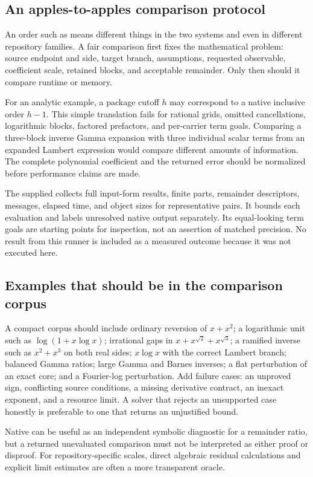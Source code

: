\documentclass[11pt,letterpaper]{article}
\newcommand{\code}[1]{\texttt{\small\detokenize{#1}}}
\begin{document}
\subsection{An apples-to-apples comparison protocol}
An order such as \code{4} means different things in the two systems and even in different repository families. A fair comparison first fixes the mathematical problem: source endpoint and side, target branch, assumptions, requested observable, coefficient scale, retained blocks, and acceptable remainder. Only then should it compare runtime or memory.

For an analytic example, a package cutoff $h$ may correspond to a native inclusive order $h-1$. This simple translation fails for rational grids, omitted cancellations, logarithmic blocks, factored prefactors, and per-carrier term goals. Comparing a three-block inverse Gamma expansion with three individual scalar terms from an expanded Lambert expression would compare different amounts of information. The complete polynomial coefficient and the returned error should be normalized before performance claims are made.

The supplied \code{CompareBuiltins.wl} collects full input-form results, finite parts, remainder descriptors, messages, elapsed time, and object sizes for representative pairs. It bounds each evaluation and labels unresolved native output separately. Its equal-looking term goals are starting points for inspection, not an assertion of matched precision. No result from this runner is included as a measured outcome because it was not executed here.

\subsection{Examples that should be in the comparison corpus}
A compact corpus should include ordinary reversion of $x+x^2$; a logarithmic unit such as $\log(1+x\log x)$; irrational gaps in $x+x^{\sqrt2}+x^{\sqrt3}$; a ramified inverse such as $x^2+x^3$ on both real sides; $x\log x$ with the correct Lambert branch; balanced Gamma ratios; large Gamma and Barnes inverses; a flat perturbation of an exact core; and a Fourier-log perturbation. Add failure cases: an unproved sign, conflicting source conditions, a missing derivative contract, an inexact exponent, and a resource limit. A solver that rejects an unsupported case honestly is preferable to one that returns an unjustified bound.

Native \code{AsymptoticLess} can be useful as an independent symbolic diagnostic for a remainder ratio, but a returned unevaluated comparison must not be interpreted as either proof or disproof. For repository-specific scales, direct algebraic residual calculations and explicit limit estimates are often a more transparent oracle.\cite{wl-asymptoticless}
\end{document}

